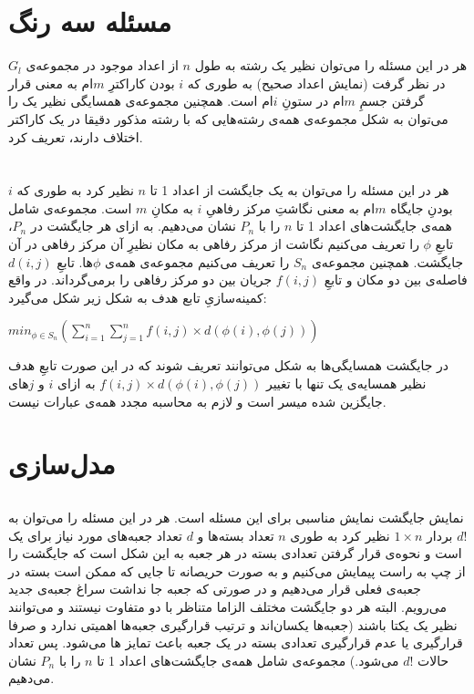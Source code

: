 \documentclass{article}
\begin{document}
\section{مسئله سه رنگ}
هر  در این مسئله را می‌توان نظیر یک رشته به طول $n$ از اعداد موجود در مجموعه‌ی $G_{l}$ در نظر گرفت (نمایش اعداد صحیح) به طوری که $i$ بودن کاراکترِ $m$ام به معنی قرار گرفتن جسمِ $m$ام در ستونِ $i$ام است. همچنین مجموعه‌ی همسایگی نظیر یک  را می‌توان به شکل مجموعه‌ی همه‌ی رشته‌هایی که با رشته مذکور دقیقا در یک کاراکتر اختلاف دارند، تعریف کرد.



\section{}
هر  در این مسئله را می‌توان به یک جایگشت از اعداد 1 تا $n$ نظیر کرد به طوری که $i$ بودنِ جایگاه $m$ام به معنی نگاشتِ مرکز رفاهیِ $i$ به مکانِ $m$ است. مجموعه‌ی شامل همه‌ی جایگشت‌های اعداد 1 تا $n$ را با $P_{n}$ نشان می‌دهیم.
به ازای هر جایگشت در $P_{n}$، تابعِ $\phi$ را تعریف می‌کنیم نگاشت از مرکز رفاهی به مکان نظیرِ آن مرکز رفاهی در آن جایگشت. همچنین مجموعه‌ی 
$
S_{n}
$
را تعریف می‌کنیم مجموعه‌ی همه‌ی $\phi$ها. 
 تابعِ 
$
d(i, j)
$
فاصله‌ی بین دو مکان و تابعِ 
$
f(i, j)
$
جریان بین دو مرکز رفاهی را برمی‌گرداند. در واقع کمینه‌سازیِ تابع هدف به شکل زیر شکل می‌گیرد:
\begin{latin}
$
min_{\phi \in S_{n}}(\sum_{i=1}^{n}\sum_{j=1}^{n} f(i, j)\times d(\phi(i), \phi(j)))
$
\end{latin}
در جایگشت همسایگی‌ها به شکل  می‌توانند تعریف شوند که در این صورت تابعِ هدف نظیر همسایه‌ی یک  تنها با تغییر
$f(i, j)\times d(\phi(i), \phi(j))$
به ازای $i$ و $j$های جایگزین شده میسر است و لازم به محاسبه مجدد همه‌ی عبارات نیست.


\section{مدل‌سازی}
\subsection{}
نمایش جایگشت نمایش مناسبی برای این مسئله است. هر  در این مسئله را می‌توان به $d!$ بردار
$1 \times n$
نظیر کرد به طوری $n$ تعداد بسته‌ها و $d$ تعداد جعبه‌های مورد نیاز برای یک   است و نحوه‌ی قرار گرفتن تعدادی بسته در هر جعبه به این شکل است که جایگشت را از چپ به راست پیمایش می‌کنیم و به صورت حریصانه تا جایی که ممکن است بسته در جعبه‌ی فعلی قرار می‌دهیم و در صورتی که جعبه جا نداشت سراغ جعبه‌ی جدید می‌رویم. البته هر دو جایگشت مختلف الزاما متناظر با دو  متفاوت نیستند و می‌توانند نظیر یک  یکتا باشند (جعبه‌ها یکسان‌اند و ترتیب قرارگیری جعبه‌ها اهمیتی ندارد و صرفا قرارگیری یا عدم قرارگیری تعدادی بسته در یک جعبه باعث تمایز ها می‌شود. پس تعداد حالات $d!$ می‌شود.)
\newline
مجموعه‌ی شامل همه‌ی جایگشت‌های اعداد 1 تا $n$ را با $P_{n}$ نشان می‌دهیم.
\end{document}
